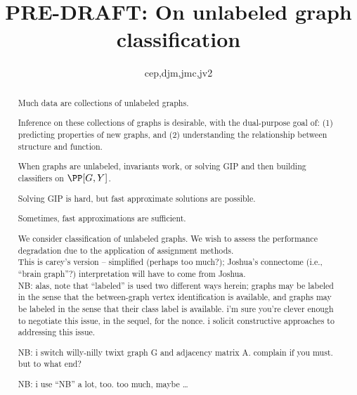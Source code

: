  
\usepackage{url}

\newcommand{\mcE}{\mathcal{E}}
\newcommand{\mcT}{\mathcal{T}}
\newcommand{\mcG}{\mathcal{G}}
\newcommand{\mcM}{\mathcal{M}}
\newcommand{\mcL}{\mathcal{L}}
\newcommand{\hatmcE}{\widehat{\mcE}}
\newcommand{\hatp}{\widehat{p}}
\newcommand{\hatP}{\widehat{P}}
\newcommand{\hatQ}{\widehat{Q}}
\newcommand{\hatL}{\widehat{L}}
\newcommand{\mhP}{\widehat{\PP}}
\newcommand{\tildeA}{\widetilde{A}}

\newcommand{\defa}{\begin{defi}}
\newcommand{\defb}{\end{defi}}


\title{PRE-DRAFT: On unlabeled graph classification}

\author{cep,djm,jmc,jv2}



\maketitle
\begin{abstract}
	
	
	
	Much data are collections of unlabeled graphs.
	
	Inference on these collections of graphs is desirable, with the dual-purpose goal of: (1) predicting properties of new graphs, and (2) understanding the relationship between structure and function.
	
	When graphs are unlabeled, invariants work, or solving GIP and then building classifiers on $\PP[G,Y]$.
	
	Solving GIP is hard, but fast approximate solutions are possible.
	
	Sometimes, fast approximations are sufficient.
	
	
	
	We consider classification of unlabeled graphs.
	We wish to assess the performance degradation
	due to the application of assignment methods.
	\\


	This is carey's version -- simplified (perhaps too much?);
	Joshua's connectome (i.e., ``brain graph''?) interpretation will have to come from Joshua.
	\\

	NB: alas, note that ``labeled'' is used two different ways herein;
	graphs may be labeled in the sense that the between-graph vertex identification is available,
	and graphs may be labeled in the sense that their class label is available.
	i'm sure you're clever enough to negotiate this issue, in the sequel, for the nonce.
	i solicit constructive approaches to addressing this issue.

	NB: i switch willy-nilly twixt graph G and adjacency matrix A.
	complain if you must. but to what end?

	NB: i use ``NB'' a lot, too. too much, maybe \dots

\end{abstract}

